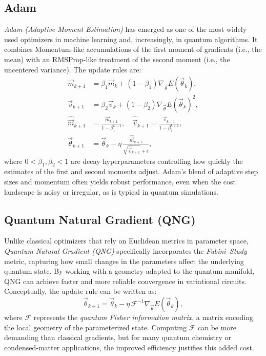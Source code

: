\subsection{Adam}
\label{subsec:adam}
\emph{Adam (Adaptive Moment Estimation)} has emerged as one of the most widely used optimizers in machine learning and, increasingly, in quantum algorithms. It combines Momentum-like accumulations of the first moment of gradients (i.e., the mean) with an RMSProp-like treatment of the second moment (i.e., the uncentered variance). The update rules are:
\[
\begin{aligned}
\vec{m}_{k+1} &= \beta_1 \vec{m}_{k} 
+ (1-\beta_1) \nabla_{\vec{\theta}} E(\vec{\theta}_{k}), \\
\vec{v}_{k+1} &= \beta_2 \vec{v}_{k} 
+ (1-\beta_2) \nabla_{\vec{\theta}} E(\vec{\theta}_{k})^2, \\
\hat{\vec{m}}_{k+1} &= \frac{\vec{m}_{k+1}}{1-\beta_1^{k+1}}, \quad
\hat{\vec{v}}_{k+1} = \frac{\vec{v}_{k+1}}{1-\beta_2^{k+1}}, \\
\vec{\theta}_{k+1} &= \vec{\theta}_{k} 
- \eta \,\frac{\hat{\vec{m}}_{k+1}}
{\sqrt{\hat{\vec{v}}_{k+1}} + \epsilon},
\end{aligned}
\]
where \(0 < \beta_1, \beta_2 < 1\) are decay hyperparameters controlling how quickly the estimates of the first and second moments adjust. Adam’s blend of adaptive step sizes and momentum often yields robust performance, even when the cost landscape is noisy or irregular, as is typical in quantum simulations.

\subsection{Quantum Natural Gradient (QNG)}
\label{subsec:qng}
Unlike classical optimizers that rely on Euclidean metrics in parameter space, \emph{Quantum Natural Gradient (QNG)} specifically incorporates the \emph{Fubini--Study} metric, capturing how small changes in the parameters affect the underlying quantum state. By working with a geometry adapted to the quantum manifold, QNG can achieve faster and more reliable convergence in variational circuits. Conceptually, the update rule can be written as:
\[
\vec{\theta}_{k+1}
= \vec{\theta}_{k}
- \eta \, \mathcal{F}^{-1} \nabla_{\vec{\theta}} E(\vec{\theta}_{k}),
\]
where \(\mathcal{F}\) represents the \emph{quantum Fisher information matrix}, a matrix encoding the local geometry of the parameterized state. Computing \(\mathcal{F}\) can be more demanding than classical gradients, but for many quantum chemistry or condensed-matter applications, the improved efficiency justifies this added cost.

